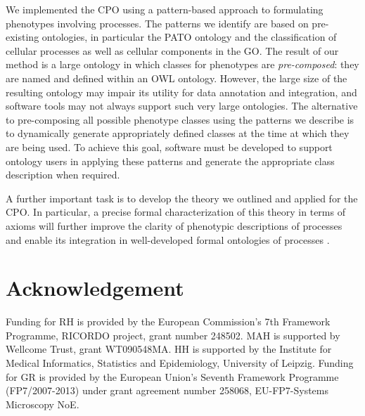 \documentclass{bioinfo}
\renewcommand{\cite}{\citep}
\begin{document}
We implemented the CPO using a pattern-based approach to formulating
phenotypes involving processes. The patterns we identify are based on
pre-existing ontologies, in particular the PATO ontology and the
classification of cellular processes as well as cellular components in
the GO. The result of our method is a large ontology in which classes
for phenotypes are {\em pre-composed}: they are named and defined
within an OWL ontology. However, the large size of the resulting
ontology may impair its utility for data annotation and integration,
and software tools may not always support such very large
ontologies. The alternative to pre-composing all possible phenotype
classes using the patterns we describe is to dynamically generate
appropriately defined classes at the time at which they are being
used. To achieve this goal, software must be developed to support
ontology users in applying these patterns and generate the appropriate
class description when required.

A further important task is to develop the theory we outlined and
applied for the CPO. In particular, a precise formal characterization
of this theory in terms of axioms will further improve the clarity of
phenotypic descriptions of processes and enable its integration in
well-developed formal ontologies of processes \cite{Herre2006,
  Gruninger2010}.

\section{Acknowledgement}
Funding for RH is provided by the European Commission's 7th Framework
Programme, RICORDO project, grant number 248502. MAH is supported by
Wellcome Trust, grant WT090548MA. HH is supported by the Institute for
Medical Informatics, Statistics and Epidemiology, University of
Leipzig.  Funding for GR is provided by the European Union's Seventh
Framework Programme (FP7/2007-2013) under grant agreement number
258068, EU-FP7-Systems Microscopy NoE. 




\end{document}
